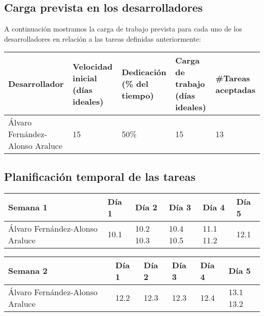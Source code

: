 \newpage
\FloatBarrier

\subsection{Carga prevista en los desarrolladores}

A continuación mostramos la carga de trabajo prevista para cada uno de los desarrolladores en relación a las tareas definidas anteriormente:

\begin{table}[h]
	\centering
	\begin{tabular}{| p{3cm} | p{2cm} | p{2cm} | p{2cm} | p{2cm} |}
		\rowcolor[HTML]{329A9D} 
		{\color[HTML]{FFFFFF} \textbf{Desarrollador}} & {\color[HTML]{FFFFFF} \textbf{Velocidad inicial (días ideales)}} & {\color[HTML]{FFFFFF} \textbf{Dedicación (\% del tiempo)}} & {\color[HTML]{FFFFFF} \textbf{Carga de trabajo (días ideales)}} & {\color[HTML]{FFFFFF} \textbf{\#Tareas aceptadas}}  \\ \hline
		Álvaro Fernández-Alonso Araluce & 15 & 50\% & 15 & 13 \\ \hline
	\end{tabular}
\end{table}

\subsection{Planificación temporal de las tareas}

\begin{table}[h]
	\centering
	\begin{tabular}{| p{2cm} | p{2cm} | p{2cm} | p{2cm} | p{2cm} | p{2cm} |}
		\rowcolor[HTML]{329A9D} 
		 {\color[HTML]{FFFFFF} \textbf{Semana 1}} & {\color[HTML]{FFFFFF} \textbf{Día 1}} & {\color[HTML]{FFFFFF} \textbf{Día 2}} & {\color[HTML]{FFFFFF} \textbf{Día 3}} & {\color[HTML]{FFFFFF} \textbf{Día 4}}  & {\color[HTML]{FFFFFF} \textbf{Día 5}} \\ \hline
		Álvaro Fernández-Alonso Araluce & 10.1 & 10.2 10.3 & 10.4 10.5 & 11.1 11.2 & 12.1 \\ \hline
	\end{tabular}
\end{table}

\begin{table}[h]
	\centering
	\begin{tabular}{| p{2cm} | p{2cm} | p{2cm} | p{2cm} | p{2cm} | p{2cm} |}
		\rowcolor[HTML]{329A9D} 
		{\color[HTML]{FFFFFF} \textbf{Semana 2}} & {\color[HTML]{FFFFFF} \textbf{Día 1}} & {\color[HTML]{FFFFFF} \textbf{Día 2}} & {\color[HTML]{FFFFFF} \textbf{Día 3}} & {\color[HTML]{FFFFFF} \textbf{Día 4}}  & {\color[HTML]{FFFFFF} \textbf{Día 5}} \\ \hline
		Álvaro Fernández-Alonso Araluce & 12.2 & 12.3 & 12.3 & 12.4 & 13.1 13.2 \\ \hline
	\end{tabular}
\end{table}

